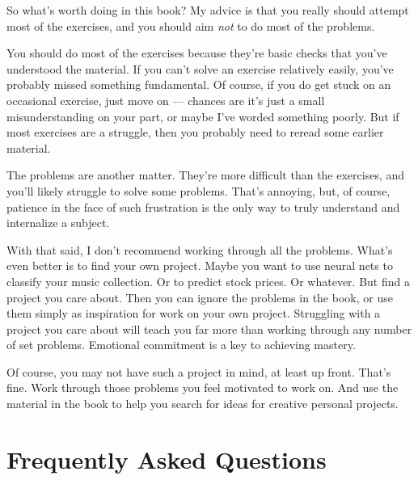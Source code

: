 So what's worth doing in this book? My advice is that you really should attempt most of the exercises, and you should aim \textit{not} to do most of the problems.

You should do most of the exercises because they're basic checks that you've understood the material. If you can't solve an exercise relatively easily, you've probably missed something fundamental. Of course, if you do get stuck on an occasional exercise, just move on --- chances are it's just a small misunderstanding on your part, or maybe I've worded something poorly. But if most exercises are a struggle, then you probably need to reread some earlier material.

The problems are another matter. They're more difficult than the exercises, and you'll likely struggle to solve some problems. That's annoying, but, of course, patience in the face of such frustration is the only way to truly understand and internalize a subject.

With that said, I don't recommend working through all the problems. What's even better is to find your own project. Maybe you want to use neural nets to classify your music collection. Or to predict stock prices. Or whatever. But find a project you care about. Then you can ignore the problems in the book, or use them simply as inspiration for work on your own project. Struggling with a project you care about will teach you far more than working through any number of set problems. Emotional commitment is a key to achieving mastery.

Of course, you may not have such a project in mind, at least up front. That's fine. Work through those problems you feel motivated to work on. And use the material in the book to help you search for ideas for creative personal projects.

\section*{Frequently Asked Questions}
\label{sec:FrequentlyAskedQuestions}

